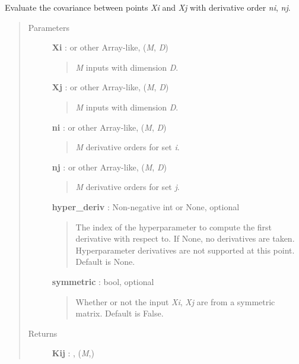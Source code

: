 \documentclass[letterpaper,10pt,english]{sphinxmanual}
\begin{document}
\begin{fulllineitems}
\begin{fulllineitems}
\label{gptools.kernel:gptools.kernel.gibbs.GibbsKernel1d.__call__}
Evaluate the covariance between points \emph{Xi} and \emph{Xj} with derivative order \emph{ni}, \emph{nj}.
\begin{quote}\begin{description}
\item[{Parameters}] \leavevmode
\textbf{Xi} :  or other Array-like, (\emph{M}, \emph{D})
\begin{quote}

\emph{M} inputs with dimension \emph{D}.
\end{quote}

\textbf{Xj} :  or other Array-like, (\emph{M}, \emph{D})
\begin{quote}

\emph{M} inputs with dimension \emph{D}.
\end{quote}

\textbf{ni} :  or other Array-like, (\emph{M}, \emph{D})
\begin{quote}

\emph{M} derivative orders for set \emph{i}.
\end{quote}

\textbf{nj} :  or other Array-like, (\emph{M}, \emph{D})
\begin{quote}

\emph{M} derivative orders for set \emph{j}.
\end{quote}

\textbf{hyper\_deriv} : Non-negative int or None, optional
\begin{quote}

The index of the hyperparameter to compute the first derivative
with respect to. If None, no derivatives are taken. Hyperparameter
derivatives are not supported at this point. Default is None.
\end{quote}

\textbf{symmetric} : bool, optional
\begin{quote}

Whether or not the input \emph{Xi}, \emph{Xj} are from a symmetric matrix.
Default is False.
\end{quote}

\item[{Returns}] \leavevmode
\textbf{Kij} : , (\emph{M},)
\begin{quote}


\end{quote}
\end{description}
\end{quote}
\end{fulllineitems}
\end{fulllineitems}
\end{document}
